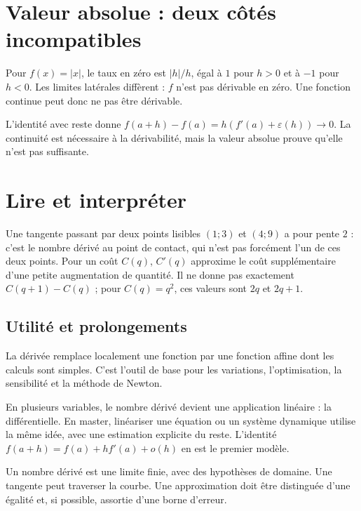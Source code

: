 \documentclass[../cours_1re.tex]{subfiles}
\begin{document}
\section{Valeur absolue : deux côtés incompatibles}
Pour $f(x)=|x|$, le taux en zéro est $|h|/h$, égal à $1$ pour $h>0$ et à $-1$ pour $h<0$. Les limites latérales diffèrent : $f$ n'est pas dérivable en zéro.
Une fonction continue peut donc ne pas être dérivable.
\begin{demonstration}
L'identité avec reste donne
$f(a+h)-f(a)=h(f'(a)+\varepsilon(h))\to0$. La continuité est nécessaire à la dérivabilité, mais la valeur absolue prouve qu'elle n'est pas suffisante.
\end{demonstration}
\section{Lire et interpréter}
Une tangente passant par deux points lisibles $(1;3)$ et $(4;9)$ a pour pente $2$ : c'est le nombre dérivé au point de contact, qui n'est pas forcément l'un de ces deux points.
Pour un coût $C(q)$, $C'(q)$ approxime le coût supplémentaire d'une petite augmentation de quantité. Il ne donne pas exactement $C(q+1)-C(q)$ ; pour $C(q)=q^2$, ces valeurs sont $2q$ et $2q+1$.

\begin{finchapitre}
\section{Utilité et prolongements}
La dérivée remplace localement une fonction par une fonction affine dont les calculs sont simples. C'est l'outil de base pour les variations, l'optimisation, la sensibilité et la méthode de Newton.

En plusieurs variables, le nombre dérivé devient une application linéaire : la différentielle. En master, linéariser une équation ou un système dynamique utilise la même idée, avec une estimation explicite du reste. L'identité $f(a+h)=f(a)+hf'(a)+o(h)$ en est le premier modèle.
\begin{retenir}
Un nombre dérivé est une limite finie, avec des hypothèses de domaine. Une tangente peut traverser la courbe. Une approximation doit être distinguée d'une égalité et, si possible, assortie d'une borne d'erreur.
\end{retenir}
\end{finchapitre}
\end{document}
